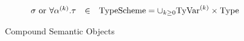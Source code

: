 \begin{figure}[h]
\begin{displaymath}
\begin{array}{rcl}
\sigma\ {\rm or}\ \forall\alpha^{(k)}.\tau
        	& \in	& {\rm TypeScheme} = \cup_{k\geq 0}{\rm TyVar}^{(k)}\times{\rm Type}\\
\end{array}
\end{displaymath}
\caption{Compound Semantic Objects}
\label{compound-objects}
\end{figure}

